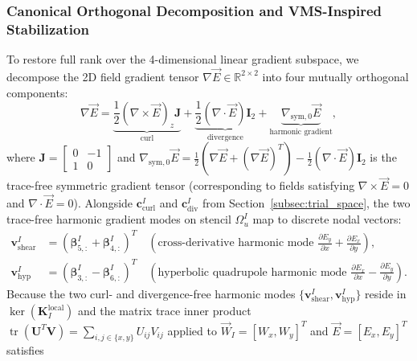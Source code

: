 \documentclass[VANCOUVER]{USG}
\begin{document}
\subsubsection{Canonical Orthogonal Decomposition and VMS-Inspired Stabilization}
\label{subsubsec:canonical_decomposition}

To restore full rank over the 4-dimensional linear gradient subspace, we decompose the 2D field gradient tensor $\nabla\vec{E} \in \mathbb{R}^{2 \times 2}$ into four mutually orthogonal components:
\begin{equation}
    \nabla \vec{E} = \underbrace{\frac{1}{2} (\nabla \times \vec{E})_z \mathbf{J}}_{\text{curl}} + \underbrace{\frac{1}{2} (\nabla \cdot \vec{E}) \mathbf{I}_2}_{\text{divergence}} + \underbrace{\nabla_{\mathrm{sym},0}\vec{E}}_{\text{harmonic gradient}},
    \label{eq:gradient_orthogonal_decomposition}
\end{equation}
where $\mathbf{J} = \begin{bmatrix} 0 & -1 \\ 1 & 0 \end{bmatrix}$ and $\nabla_{\mathrm{sym},0}\vec{E} = \frac{1}{2}(\nabla\vec{E} + (\nabla\vec{E})^T) - \frac{1}{2}(\nabla\cdot\vec{E})\mathbf{I}_2$ is the trace-free symmetric gradient tensor (corresponding to fields satisfying $\nabla\times\vec{E}=0$ and $\nabla\cdot\vec{E}=0$). Alongside $\mathbf{c}_{\mathrm{curl}}^I$ and $\mathbf{c}_{\mathrm{div}}^I$ from Section~\ref{subsec:trial_space}, the two trace-free harmonic gradient modes on stencil $\Omega_u^I$ map to discrete nodal vectors:
\begin{align}
    \mathbf{v}_{\mathrm{shear}}^I & = (\boldsymbol{\beta}_{5, :}^I + \boldsymbol{\beta}_{4, :}^I)^T \quad \left(\text{cross-derivative harmonic mode } \frac{\partial E_y}{\partial x} + \frac{\partial E_x}{\partial y}\right), \label{eq:v_shear_def}                   \\
    \mathbf{v}_{\mathrm{hyp}}^I   & = (\boldsymbol{\beta}_{3, :}^I - \boldsymbol{\beta}_{6, :}^I)^T \quad \left(\text{hyperbolic quadrupole harmonic mode } \frac{\partial E_x}{\partial x} - \frac{\partial E_y}{\partial y}\right). \label{eq:v_hyp_def}
\end{align}
Because the two curl- and divergence-free harmonic modes $\{\mathbf{v}_{\mathrm{shear}}^I, \mathbf{v}_{\mathrm{hyp}}^I\}$ reside in $\ker(\mathbf{K}_I^{\mathrm{local}})$ and the matrix trace inner product $\operatorname{tr}(\mathbf{U}^T\mathbf{V}) = \sum_{i,j \in \{x,y\}} U_{ij} V_{ij}$ applied to $\vec{W}_I = [W_x, W_y]^T$ and $\vec{E} = [E_x, E_y]^T$ satisfies
\end{document}
